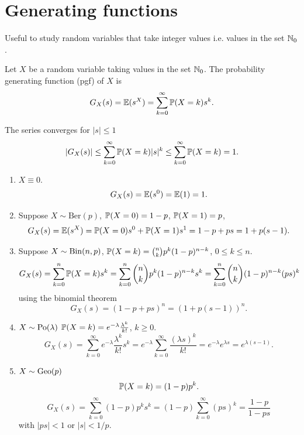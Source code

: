 \documentclass[10pt, a4paper]{article}
\begin{document}
\newpage

\section{Generating functions}

Useful to study random variables that take integer values i.e. values in the set $\N_0$.

\begin{definition}
    Let $X$ be a random variable taking values in the set $\N_0$.
    The probability generating function
    (pgf)
    of $X$ is
    \[
    G_{X}(s) = \E(s ^ X) = \sum_{k = 0}^{\infty}\P(X = k)s ^ k.
    \]
\end{definition}
The series converges for $|s| \leq 1$
\[
|G_X(s)| \leq \sum_{k = 0}^{\infty}\P(X = k)|s| ^ k \leq \sum_{k = 0}^{\infty}\P(X = k) = 1.
\]
\begin{example}\phantom{}
    \begin{enumerate}[label = (\alph*)]
        \item $X \equiv 0$.
        \[
        G_X(s) = \E(s ^ 0) = \E(1) = 1.
        \]

        \item Suppose $X \sim \mathrm{Ber}(p)$,
        $\P(X = 0) = 1 - p$,
        $\P(X = 1) = p$,
        \[
        G_{X}(s) = \E(s ^ X) = \P(X = 0)s ^ 0 + \P(X = 1)s ^ 1 = 1 - p + ps = 1 + p(s - 1).
        \]

        \item Suppose $X \sim \Bin(n, p)$,
        $\P(X = k) = \binom{n}{k}p ^ k(1 - p) ^ {n - k}$,
        $0 \leq k \leq n$.
        \[
        G_X(s) = \sum_{k = 0}^{n}\P(X = k)s ^ k = \sum_{k = 0}^{n}\binom{n}{k}p ^ k(1 - p) ^ {n - k}s ^ k = \sum_{k = 0}^{n}\binom{n}{k}(1 - p) ^ {n - k}(ps) ^ k
        \]
        using the binomial theorem
        \[
        G_X(s) = (1 - p + ps) ^ n = (1 + p(s - 1)) ^ n.
        \]

        \item $X \sim \Po(\lambda)$ $\P(X = k) = e ^ {-\lambda}\frac{\lambda ^ k}{k!}$,
        $k \geq 0$.
        \[
        G_X(s) = \sum_{k = 0}^{\infty}e ^ {-\lambda}\frac{\lambda ^ k}{k!}s ^ k = e ^ {-\lambda}\sum_{k = 0}^{\infty}\frac{(\lambda s) ^ k}{k!} = e ^ {-\lambda}e ^ {\lambda s} = e ^ {\lambda(s - 1)}.
        \]

        \item $X \sim \Geo(p)$
        \[
        \P(X = k) = (1 - p)p ^ k.
        \]
        \[
        G_X(s) = \sum_{k = 0}^{\infty}(1 - p)p ^ ks ^ k = (1 - p)\sum_{k = 0}^{\infty}(ps) ^ k = \frac{1 - p}{1 - ps}
        \]
        with $|ps| < 1$ or $|s| < 1 / p$.
    \end{enumerate}
\end{example}
\end{document}
